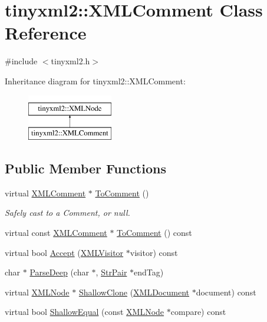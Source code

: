 \hypertarget{classtinyxml2_1_1_x_m_l_comment}{}\section{tinyxml2\+:\+:X\+M\+L\+Comment Class Reference}
\label{classtinyxml2_1_1_x_m_l_comment}


{\ttfamily \#include $<$tinyxml2.\+h$>$}

Inheritance diagram for tinyxml2\+:\+:X\+M\+L\+Comment\+:\begin{figure}[H]
\begin{center}
\leavevmode
\includegraphics[height=2.000000cm]{classtinyxml2_1_1_x_m_l_comment}
\end{center}
\end{figure}
\subsection*{Public Member Functions}
\begin{DoxyCompactItemize}
\item 
virtual \hyperlink{classtinyxml2_1_1_x_m_l_comment}{X\+M\+L\+Comment} $\ast$ \hyperlink{classtinyxml2_1_1_x_m_l_comment_a8093e1dc8a34fa446d9dc3fde0e6c0ee}{To\+Comment} ()
\begin{DoxyCompactList}\small\item\em Safely cast to a Comment, or null. \end{DoxyCompactList}\item 
virtual const \hyperlink{classtinyxml2_1_1_x_m_l_comment}{X\+M\+L\+Comment} $\ast$ \hyperlink{classtinyxml2_1_1_x_m_l_comment_a422aabac22de7d9c9cad130897dd8b1c}{To\+Comment} () const 
\item 
virtual bool \hyperlink{classtinyxml2_1_1_x_m_l_comment_aa382b1be6a8b0650c16a2d88bb499335}{Accept} (\hyperlink{classtinyxml2_1_1_x_m_l_visitor}{X\+M\+L\+Visitor} $\ast$visitor) const 
\item 
char $\ast$ \hyperlink{classtinyxml2_1_1_x_m_l_comment_aa6ab35c3bb1c1840371dc32a2040c57f}{Parse\+Deep} (char $\ast$, \hyperlink{classtinyxml2_1_1_str_pair}{Str\+Pair} $\ast$end\+Tag)
\item 
virtual \hyperlink{classtinyxml2_1_1_x_m_l_node}{X\+M\+L\+Node} $\ast$ \hyperlink{classtinyxml2_1_1_x_m_l_comment_a90bb60193a691b484f5e1b487857016d}{Shallow\+Clone} (\hyperlink{classtinyxml2_1_1_x_m_l_document}{X\+M\+L\+Document} $\ast$document) const 
\item 
virtual bool \hyperlink{classtinyxml2_1_1_x_m_l_comment_a2d9f26757b0018fce933e74420cda22a}{Shallow\+Equal} (const \hyperlink{classtinyxml2_1_1_x_m_l_node}{X\+M\+L\+Node} $\ast$compare) const 
\end{DoxyCompactItemize}
